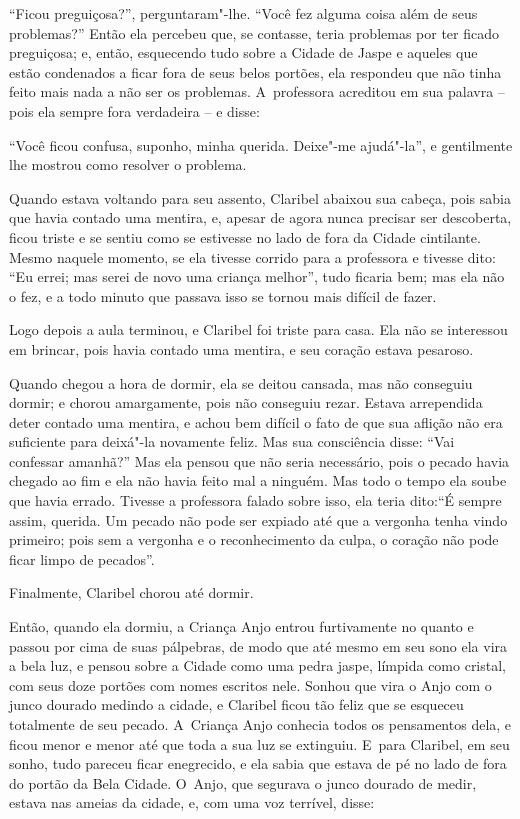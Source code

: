 ``Ficou preguiçosa?'', perguntaram"-lhe. ``Você fez alguma coisa além de
seus problemas?'' Então ela percebeu que, se contasse, teria problemas por
ter ficado preguiçosa; e, então, esquecendo tudo sobre a Cidade de Jaspe
e aqueles que estão condenados a ficar fora de seus belos portões, ela
respondeu que não tinha feito mais nada a não ser os problemas. A~professora acreditou em sua palavra -- pois ela sempre fora verdadeira
-- e disse:

``Você ficou confusa, suponho, minha querida. Deixe"-me ajudá"-la'', e
gentilmente lhe mostrou como resolver o problema.

Quando estava voltando para seu assento, Claribel abaixou sua cabeça,
pois sabia que havia contado uma mentira, e, apesar de agora nunca
precisar ser descoberta, ficou triste e se sentiu como se estivesse no
lado de fora da Cidade cintilante. Mesmo naquele momento, se ela tivesse
corrido para a professora e tivesse dito: ``Eu errei; mas serei de novo
uma criança melhor'', tudo ficaria bem; mas ela não o fez, e a todo
minuto que passava isso se tornou mais difícil de fazer.

Logo depois a aula terminou, e Claribel foi triste para casa. Ela não se
interessou em brincar, pois havia contado uma mentira, e seu coração
estava pesaroso.

Quando chegou a hora de dormir, ela se deitou cansada, mas não conseguiu
dormir; e chorou amargamente, pois não conseguiu rezar. Estava
arrependida deter contado uma mentira, e achou bem difícil o fato de que
sua aflição não era suficiente para deixá"-la novamente feliz. Mas sua
consciência disse: ``Vai confessar amanhã?'' Mas ela pensou que não
seria necessário, pois o pecado havia chegado ao fim e ela não havia
feito mal a ninguém. Mas todo o tempo ela soube que havia errado.
Tivesse a professora falado sobre isso, ela teria dito:``É sempre assim,
querida. Um pecado não pode ser expiado até que a vergonha tenha vindo
primeiro; pois sem a vergonha e o reconhecimento da culpa, o coração não
pode ficar limpo de pecados''.

Finalmente, Claribel chorou até dormir.

Então, quando ela dormiu, a Criança Anjo entrou furtivamente no quanto e
passou por cima de suas pálpebras, de modo que até mesmo em seu sono ela
vira a bela luz, e pensou sobre a Cidade como uma pedra jaspe, límpida
como cristal, com seus doze portões com nomes escritos nele. Sonhou que
vira o Anjo com o junco dourado medindo a cidade, e Claribel ficou tão
feliz que se esqueceu totalmente de seu pecado. A~Criança Anjo conhecia
todos os pensamentos dela, e ficou menor e menor até que toda a sua luz
se extinguiu. E~para Claribel, em seu sonho, tudo pareceu ficar
enegrecido, e ela sabia que estava de pé no lado de fora do portão da
Bela Cidade. O~Anjo, que segurava o junco dourado de medir, estava nas
ameias da cidade, e, com uma voz terrível, disse:

